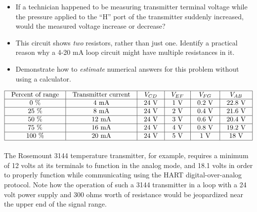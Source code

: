 \begin{itemize}
\item{} If a technician happened to be measuring transmitter terminal voltage while the pressure applied to the ``H'' port of the transmitter suddenly increased, would the measured voltage increase or decrease?  
\item{} This circuit shows {\it two} resistors, rather than just one.  Identify a practical reason why a 4-20 mA loop circuit might have multiple resistances in it.
\item{} Demonstrate how to {\it estimate} numerical answers for this problem without using a calculator.
\end{itemize}








$$\vbox{\offinterlineskip
\halign{\strut
\vrule \quad\hfil # \ \hfil & 
\vrule \quad\hfil # \ \hfil & 
\vrule \quad\hfil # \ \hfil & 
\vrule \quad\hfil # \ \hfil & 
\vrule \quad\hfil # \ \hfil & 
\vrule \quad\hfil # \ \hfil \vrule \cr
\noalign{\hrule}
%
Percent of range & Transmitter current & $V_{CD}$ & $V_{EF}$ & $V_{FG}$ & $V_{AB}$ \cr
%
\noalign{\hrule}
%
0 \% & 4 mA & 24 V & 1 V & 0.2 V & 22.8 V \cr
%
\noalign{\hrule}
%
25 \% & 8 mA & 24 V & 2 V & 0.4 V & 21.6 V \cr
%
\noalign{\hrule}
%
50 \% & 12 mA & 24 V & 3 V & 0.6 V & 20.4 V \cr
%
\noalign{\hrule}
%
75 \% & 16 mA & 24 V & 4 V & 0.8 V & 19.2 V \cr
%
\noalign{\hrule}
%
100 \% & 20 mA & 24 V & 5 V & 1 V & 18 V \cr
%
\noalign{\hrule}
} %
}$$ %

The Rosemount 3144 temperature transmitter, for example, requires a minimum of 12 volts at its terminals to function in the analog mode, and 18.1 volts in order to properly function while communicating using the HART digital-over-analog protocol.  Note how the operation of such a 3144 transmitter in a loop with a 24 volt power supply and 300 ohms worth of resistance would be jeopardized near the upper end of the signal range.











